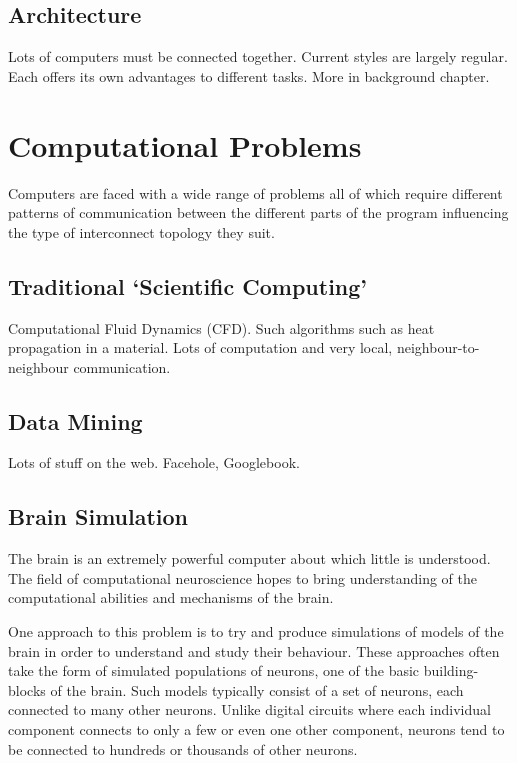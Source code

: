 			
		\subsection{Architecture}
			
			Lots of computers must be connected together. Current styles are largely
			regular. Each offers its own advantages to different tasks. More in
			background chapter.
	
	\section{Computational Problems}
		
		Computers are faced with a wide range of problems all of which require
		different patterns of communication between the different parts of the
		program influencing the type of interconnect topology they suit.
		
		\subsection{Traditional `Scientific Computing'}
			
			Computational Fluid Dynamics (CFD).  Such algorithms such as heat
			propagation in a material. Lots of computation and very local,
			neighbour-to-neighbour communication.
		
		\subsection{Data Mining}
			
			Lots of stuff on the web. Facehole, Googlebook.
		
		\subsection{Brain Simulation}
			
			
			The brain is an extremely powerful computer about which little is
			understood. The field of computational neuroscience hopes to bring
			understanding of the computational abilities and mechanisms of the
			brain.
			
			One approach to this problem is to try and produce simulations of models
			of the brain in order to understand and study their behaviour. These
			approaches often take the form of simulated populations of neurons, one
			of the basic building-blocks of the brain. Such models typically consist
			of a set of neurons, each connected to many other neurons.  Unlike
			digital circuits where each individual component connects to only a few
			or even one other component, neurons tend to be connected to hundreds or
			thousands of other neurons.
			
